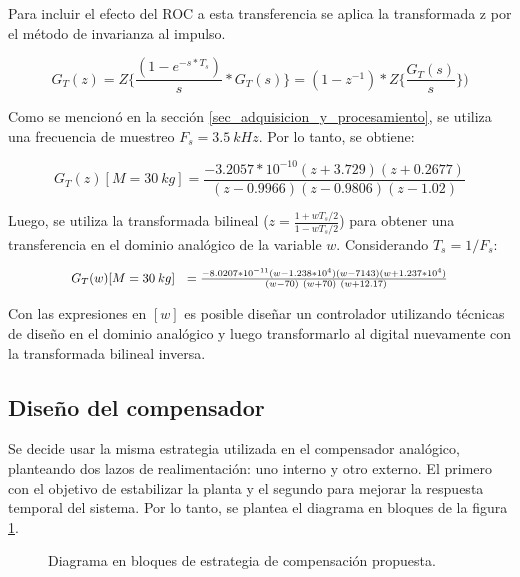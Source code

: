 Para incluir el efecto del ROC a esta transferencia se aplica la transformada z por el método de invarianza al impulso. 

\begin{equation*}
	G_T(z)=Z\{\frac{(1-e^{-s*T_s})}{s}*G_T(s)\}=(1-z^{-1})*Z\{\frac{G_T(s)}{s}\})
\end{equation*}

 Como se mencionó en la sección \ref{sec_adquisicion_y_procesamiento}, se utiliza una frecuencia de muestreo  $F_s=3.5\:kHz$. Por lo tanto, se obtiene:

\begin{equation} 
	G_T(z)[M=30\:kg] =\frac{-3.2057*10^{-10}(z+3.729)(z+0.2677)}{(z-0.9966)(z-0.9806) (z-1.02)}
\end{equation}

Luego, se utiliza la transformada bilineal ($z=\frac{1+wT_s/2}{1-wT_s/2}$) para obtener una transferencia en el dominio analógico de la variable $w$. Considerando $T_s=1/F_s$:

\begin{equation}
	\resizebox{.8\hsize}{!}
	{
		$G_T(w)[M=30\:kg]\ \ =\frac{-8.0207*10^{-11}(w-1.238*10^4)(w-7143)(w+1.237*10^4)}{\ (w-70)\ (w+70)\ (w+12.17)}$
	}
\end{equation}


Con las expresiones en $[w]$ es posible diseñar un controlador utilizando técnicas de diseño en el dominio analógico y luego transformarlo al digital nuevamente con la transformada bilineal inversa.



\subsection{Diseño del compensador}

Se decide usar la misma estrategia utilizada en el compensador analógico, planteando dos lazos de realimentación: uno interno y otro externo. El primero con el objetivo de estabilizar la planta y el segundo para mejorar la respuesta temporal del sistema. Por lo tanto, se plantea el diagrama en bloques de la figura \ref{fig:diag-en-bloques-comp_digital}.

\begin{figure}[H]
	\centering
	\scalebox{0.8}{}
	\caption{Diagrama en bloques de estrategia de compensación propuesta.}	\label{fig:diag-en-bloques-comp_digital}
\end{figure}

